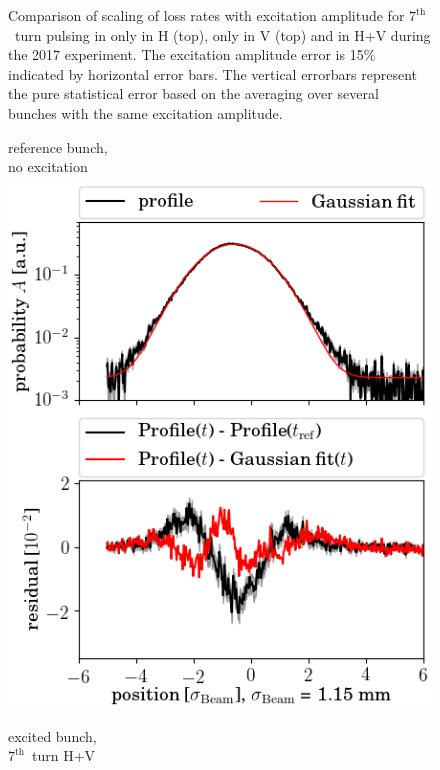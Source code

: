 \documentclass[%
 reprint,
 amsmath,amssymb,
 aps,
prstab,
]{revtex4-1}
\begin{document}
\begin{figure}[h]
\begin{minipage}[t]{1.0\linewidth}
	\end{minipage}
	\caption{\label{fig:7thexploss2017} Comparison of scaling of loss rates with excitation amplitude for $7^{\mathrm{th}}$~turn pulsing in only in H (top), only in V (top) and in H+V during the 2017 experiment. The excitation amplitude error is 15\% indicated by horizontal error bars. The vertical errorbars represent the pure statistical error based on the averaging over several bunches with the same excitation amplitude.}
\end{figure}
\begin{figure}[h]
	\begin{minipage}[t]{0.49\linewidth}
		\centering
		reference bunch,\\ no excitation
		\includegraphics[width=1.0\linewidth]{profile_v_7thhv_slot_2862.png}
	\end{minipage}
	\begin{minipage}[t]{0.49\linewidth}
		\centering
		excited bunch,\\ $7^{\mathrm{th}}$~turn H+V	

\end{minipage}
\end{figure}
\end{document}
